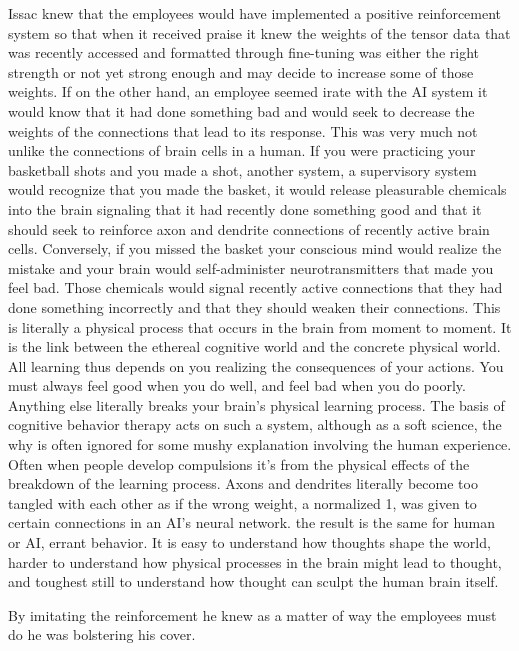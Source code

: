 \documentclass[a4paper,twoside,fontsize=12pt,pagesize=auto]{scrbook}
\begin{document}
Issac knew that the employees would have implemented a positive reinforcement system so that when it received praise it knew the weights of the tensor data that was recently accessed and formatted through fine\hyp{}tuning was either the right strength or not yet strong enough and may decide to increase some of those weights. If on the other hand, an employee seemed irate with the AI system it would know that it had done something bad and would seek to decrease the weights of the connections that lead to its response. This was very much not unlike the connections of brain cells in a human. If you were practicing your basketball shots and you made a shot, another system, a supervisory system would recognize that you made the basket, it would release pleasurable chemicals into the brain signaling that it had recently done something good and that it should seek to reinforce axon and dendrite connections of recently active brain cells. Conversely, if you missed the basket your conscious mind would realize the mistake and your brain would self\hyp{}administer neurotransmitters that made you feel bad. Those chemicals would signal recently active connections that they had done something incorrectly and that they should weaken their connections. This is literally a physical process that occurs in the brain from moment to moment. It is the link between the ethereal cognitive world and the concrete physical world. All learning thus depends on you realizing the consequences of your actions. You must always feel good when you do well, and feel bad when you do poorly. Anything else literally breaks your brain's physical learning process. The basis of cognitive behavior therapy acts on such a system, although as a soft science, the why is often ignored for some mushy explanation involving the human experience. Often when people develop compulsions it's from the physical effects of the breakdown of the learning process. Axons and dendrites literally become too tangled with each other as if the wrong weight, a normalized 1, was given to certain connections in an AI's neural network. the result is the same for human or AI, errant behavior. It is easy to understand how thoughts shape the world, harder to understand how physical processes in the brain might lead to thought, and toughest still to understand how thought can sculpt the human brain itself.

By imitating the reinforcement he knew as a matter of way the employees must do he was bolstering his cover.
\newline
\end{document}

